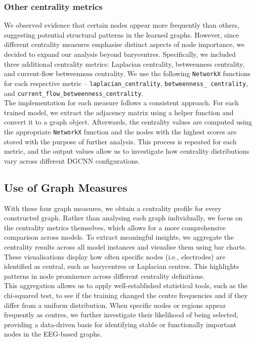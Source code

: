 \subsubsection{Other centrality metrics}
We observed evidence that certain nodes appear more frequently than others, suggesting potential structural patterns in the learned graphs. However, since different centrality measures emphasise distinct aspects of node importance, we decided to expand our analysis beyond barycentres. Specifically, we included three additional centrality metrics: Laplacian centrality, betweenness centrality, and current-flow betweenness centrality. We use the following \texttt{NetworkX} functions for each respective metric – \texttt{laplacian\_centrality}, \texttt{betweenness\_ centrality}, and \texttt{current\_flow\_betweenness\_centrality}.
\vspace{0.5em}\\
The implementation for each measure follows a consistent approach. For each trained model, we extract the adjacency matrix using a helper function and convert it to a graph object. Afterwards, the centrality values are computed using the appropriate \texttt{NetworkX} function and the nodes with the highest scores are stored with the purpose of further analysis. This process is repeated for each metric, and the output values allow us to investigate how centrality distributions vary across different DGCNN configurations. 
\subsection{Use of Graph Measures}
With these four graph measures, we obtain a centrality profile for every constructed graph. Rather than analysing each graph individually, we focus on the centrality metrics themselves, which allows for a more comprehensive comparison across models. To extract meaningful insights, we aggregate the centrality results across all model instances and visualise them using bar charts. These visualisations display how often specific nodes (i.e., electrodes) are identified as central, such as barycentres or Laplacian centres. This highlights patterns in node prominence across different centrality definitions.
\vspace{0.5em}\\
This aggregation allows us to apply well-established statistical tools, such as the chi-squared test, to see if the training changed the centre frequencies and if they differ from a uniform distribution.
When specific nodes or regions appear frequently as centres, we further investigate their likelihood of being selected, providing a data-driven basis for identifying stable or functionally important nodes in the EEG-based graphs. 
